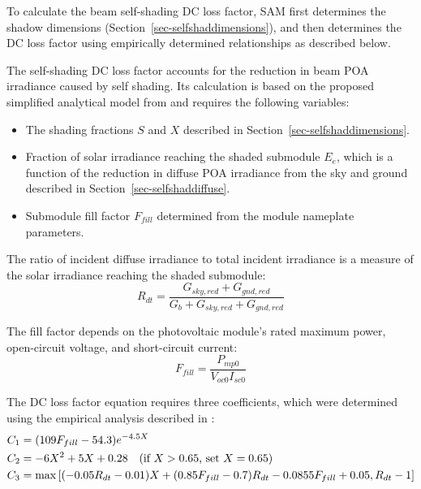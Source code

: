 \documentclass[12pt,letterpaper]{article}
\begin{document}

To calculate the beam self-shading DC loss factor, SAM first determines the shadow dimensions (Section~\ref{sec-selfshaddimensions}), and then determines the DC loss factor using empirically determined relationships as described below.

The self-shading DC loss factor accounts for the reduction in beam POA irradiance caused by self shading. Its calculation is based on the proposed simplified analytical model from \citep{deline2013a} and requires the following variables:
\begin{itemize}
\item The shading fractions $S$ and $X$ described in Section~\ref{sec-selfshaddimensions}.
\item Fraction of solar irradiance reaching the shaded submodule $E_e$, which is a function of the reduction in diffuse POA irradiance from the sky and ground described in Section~\ref{sec-selfshaddiffuse}.
\item Submodule fill factor $\mathit{F}_{fill}$ determined from the module nameplate parameters.
\end{itemize}

The ratio of incident diffuse irradiance to total incident irradiance is a measure of the solar irradiance reaching the shaded submodule:
\begin{equation}
R_{dt} = \frac{G_{sky,red}+G_{gnd,red}}{G_b+G_{sky,red}+G_{gnd,red}}
\end{equation}

The fill factor depends on the photovoltaic module's rated maximum power, open-circuit voltage, and short-circuit current:
\begin{equation}
F_{fill}=\frac{P_{mp0}}{V_{oc0}I_{sc0}}
\end{equation}

The DC loss factor equation requires three coefficients, which were determined using the empirical analysis described in \citet{deline2013a}:
\begin{align}
C_1 &= (109F_{fill}-54.3)e^{-4.5X} \notag\\
C_2 &= -6X^2+5X+0.28 \quad \text{(if $X>0.65$, set $X=0.65$)}\notag\\
C_3 &= \max\left[(-0.05R_{dt}-0.01)X+(0.85F_{fill}-0.7)R_{dt}-0.0855F_{fill}+0.05,R_{dt}-1\right]
\end{align}
\end{document}

